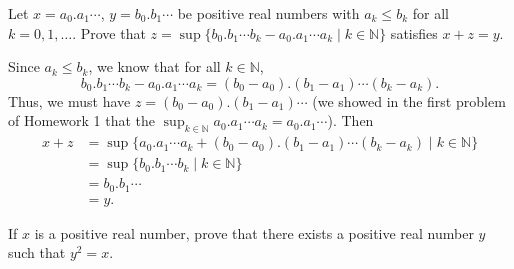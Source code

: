 \documentclass[12 pt, letterpaper]{hmcpset}
\begin{document}
\begin{problem}[1.]
	Let $x = a_{0}.a_{1} \cdots$, $y = b_{0}.b_{1} \cdots$ be positive real numbers with $a_{k} \le b_{k}$ for all $k = 0, 1, \dots$. Prove that $z = \sup \{ b_{0}.b_{1} \cdots b_{k} - a_{0}.a_{1} \cdots a_{k} \mid k \in \mathbb{N} \}$ satisfies $x + z = y$.
\end{problem}

\begin{solution}
	Since $a_{k} \le b_{k}$, we know that for all $k \in \mathbb{N}$,
	\[
		b_{0}.b_{1} \cdots b_{k} - a_{0}.a_{1} \cdots a_{k} = (b_{0} - a_{0}).(b_{1} - a_{1}) \cdots (b_{k} - a_{k}).
	\]
	Thus, we must have $z = (b_{0} - a_{0}).(b_{1} - a_{1}) \cdots$ (we showed in the first problem of Homework 1 that the $\sup_{k \in \mathbb{N}} a_{0}.a_{1} \cdots a_{k} = a_{0}.a_{1} \cdots$). Then
	\[
		\begin{split}
			x + z & = \sup \{ a_{0}.a_{1} \cdots a_{k} + (b_{0} - a_{0}).(b_{1} - a_{1}) \cdots (b_{k} - a_{k}) \mid k \in \mathbb{N} \} \\
			      & = \sup \{ b_{0}.b_{1} \cdots b_{k} \mid k \in \mathbb{N} \} \\
			      & = b_{0}.b_{1} \cdots \\
			      & = y.
		\end{split}
	\]
\end{solution}

\pagebreak

\begin{problem}[2.]
	If $x$ is a positive real number, prove that there exists a positive real number $y$ such that $y^{2} = x$.
\end{problem}
\end{document}
